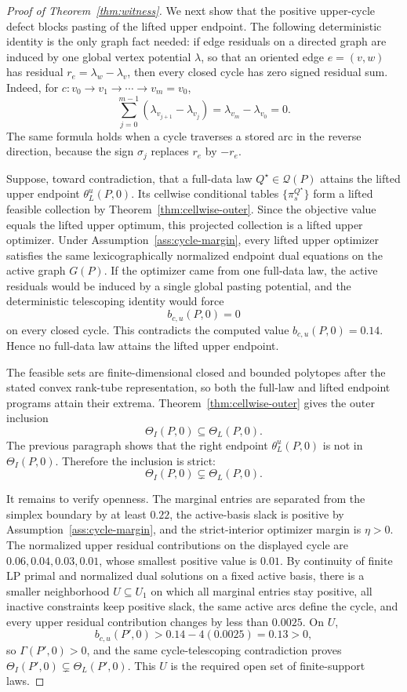 \begin{proof}[Proof of Theorem~\ref{thm:witness}]
We next show that the positive upper-cycle defect blocks pasting of the lifted upper endpoint.  The following deterministic identity is the only graph fact needed: if edge residuals on a directed graph are induced by one global vertex potential \(\lambda\), so that an oriented edge \(e=(v,w)\) has residual \(r_e=\lambda_w-\lambda_v\), then every closed cycle has zero signed residual sum.  Indeed, for \(c:v_0\to v_1\to\cdots\to v_m=v_0\),
\[
\sum_{j=0}^{m-1}(\lambda_{v_{j+1}}-\lambda_{v_j})=\lambda_{v_m}-\lambda_{v_0}=0.
\]
The same formula holds when a cycle traverses a stored arc in the reverse direction, because the sign \(\sigma_j\) replaces \(r_e\) by \(-r_e\).

Suppose, toward contradiction, that a full-data law \(Q^\star\in\mathcal Q(P)\) attains the lifted upper endpoint \(\theta_L^u(P,0)\).  Its cellwise conditional tables \(\{\pi_s^{Q^\star}\}\) form a lifted feasible collection by Theorem~\ref{thm:cellwise-outer}.  Since the objective value equals the lifted upper optimum, this projected collection is a lifted upper optimizer.  Under Assumption~\ref{ass:cycle-margin}, every lifted upper optimizer satisfies the same lexicographically normalized endpoint dual equations on the active graph \(G(P)\).  If the optimizer came from one full-data law, the active residuals would be induced by a single global pasting potential, and the deterministic telescoping identity would force
\[
b_{c,u}(P,0)=0
\]
on every closed cycle.  This contradicts the computed value \(b_{c,u}(P,0)=0.14\).  Hence no full-data law attains the lifted upper endpoint.

The feasible sets are finite-dimensional closed and bounded polytopes after the stated convex rank-tube representation, so both the full-law and lifted endpoint programs attain their extrema.  Theorem~\ref{thm:cellwise-outer} gives the outer inclusion
\[
\Theta_I(P,0)\subseteq\Theta_L(P,0).
\]
The previous paragraph shows that the right endpoint \(\theta_L^u(P,0)\) is not in \(\Theta_I(P,0)\).  Therefore the inclusion is strict:
\[
\Theta_I(P,0)\subsetneq\Theta_L(P,0).
\]

It remains to verify openness.  The marginal entries are separated from the simplex boundary by at least \(0.22\), the active-basis slack is positive by Assumption~\ref{ass:cycle-margin}, and the strict-interior optimizer margin is \(\eta>0\).  The normalized upper residual contributions on the displayed cycle are \(0.06,0.04,0.03,0.01\), whose smallest positive value is \(0.01\).  By continuity of finite LP primal and normalized dual solutions on a fixed active basis, there is a smaller neighborhood \(U\subseteq U_1\) on which all marginal entries stay positive, all inactive constraints keep positive slack, the same active arcs define the cycle, and every upper residual contribution changes by less than \(0.0025\).  On \(U\),
\[
b_{c,u}(P',0)>0.14-4(0.0025)=0.13>0,
\]
so \(\Gamma(P',0)>0\), and the same cycle-telescoping contradiction proves \(\Theta_I(P',0)\subsetneq\Theta_L(P',0)\).  This \(U\) is the required open set of finite-support laws.
\end{proof}


